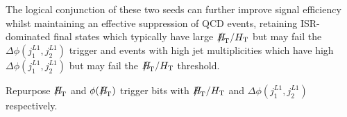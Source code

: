 The logical conjunction of these two seeds can further improve signal efficiency whilst maintaining an effective suppression of QCD events, retaining ISR-dominated final states which typically have large $\mht/\scalht$ but may fail the $\Delta\phi(j_{1}^{L1},j_{2}^{L1})$ trigger and events with high jet multiplicities which have high $\Delta\phi(j_{1}^{L1},j_{2}^{L1})$ but may fail the $\mht/\scalht$ threshold.

Repurpose $\mht$ and $\phi({\mht})$ trigger bits with $\mht/\scalht$ and $\Delta\phi(j_{1}^{L1},j_{2}^{L1})$ respectively.


